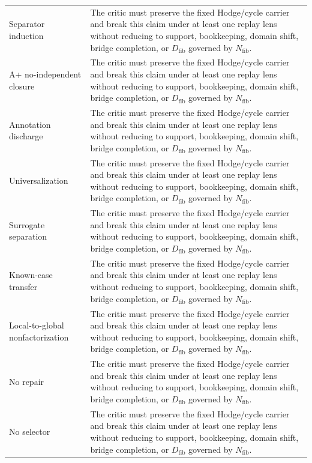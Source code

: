 \documentclass[11pt]{article}
\begin{document}
{\begin{longtable}{p{}p{}}
Separator induction & The critic must preserve the fixed Hodge/cycle carrier and break this claim under at least one replay lens without reducing to support, bookkeeping, domain shift, bridge completion, or $D_{\mathrm{fib}}$ governed by $N_{\mathrm{fib}}$.\\
A+ no-independent closure & The critic must preserve the fixed Hodge/cycle carrier and break this claim under at least one replay lens without reducing to support, bookkeeping, domain shift, bridge completion, or $D_{\mathrm{fib}}$ governed by $N_{\mathrm{fib}}$.\\
Annotation discharge & The critic must preserve the fixed Hodge/cycle carrier and break this claim under at least one replay lens without reducing to support, bookkeeping, domain shift, bridge completion, or $D_{\mathrm{fib}}$ governed by $N_{\mathrm{fib}}$.\\
Universalization & The critic must preserve the fixed Hodge/cycle carrier and break this claim under at least one replay lens without reducing to support, bookkeeping, domain shift, bridge completion, or $D_{\mathrm{fib}}$ governed by $N_{\mathrm{fib}}$.\\
Surrogate separation & The critic must preserve the fixed Hodge/cycle carrier and break this claim under at least one replay lens without reducing to support, bookkeeping, domain shift, bridge completion, or $D_{\mathrm{fib}}$ governed by $N_{\mathrm{fib}}$.\\
Known-case transfer & The critic must preserve the fixed Hodge/cycle carrier and break this claim under at least one replay lens without reducing to support, bookkeeping, domain shift, bridge completion, or $D_{\mathrm{fib}}$ governed by $N_{\mathrm{fib}}$.\\
Local-to-global nonfactorization & The critic must preserve the fixed Hodge/cycle carrier and break this claim under at least one replay lens without reducing to support, bookkeeping, domain shift, bridge completion, or $D_{\mathrm{fib}}$ governed by $N_{\mathrm{fib}}$.\\
No repair & The critic must preserve the fixed Hodge/cycle carrier and break this claim under at least one replay lens without reducing to support, bookkeeping, domain shift, bridge completion, or $D_{\mathrm{fib}}$ governed by $N_{\mathrm{fib}}$.\\
No selector & The critic must preserve the fixed Hodge/cycle carrier and break this claim under at least one replay lens without reducing to support, bookkeeping, domain shift, bridge completion, or $D_{\mathrm{fib}}$ governed by $N_{\mathrm{fib}}$.\\

\end{longtable}}
\end{document}
